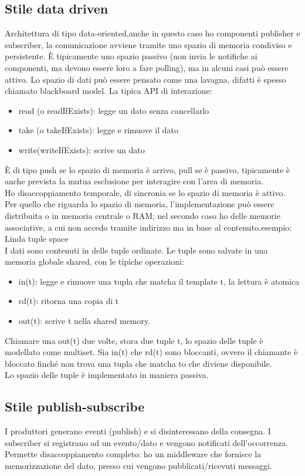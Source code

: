 \documentclass{article}
\begin{document}
\subsection{Stile data driven}
Architettura di tipo data-oriented,anche in questo caso ho componenti publisher e subscriber, la comunicazione avviene tramite uno spazio di memoria condiviso e persistente. È tipicamente uno spazio passivo (non invia le notifiche ai componenti, ma devono essere loro a fare polling), ma in alcuni casi può essere attivo. Lo spazio di dati può essere pensato come una lavagna, difatti è spesso chiamato blackboard model. La tipica API di interazione:
\begin{itemize}
\item read (o readIfExists): legge un dato senza cancellarlo
\item take (o takeIfExists): legge e rimuove il dato
\item write(writeIfExists): scrive un dato  
\end{itemize}
È di tipo push se lo spazio di memoria è arrivo, pull se è passivo, tipicamente è anche prevista la mutua esclusione per interagire con l'area di memoria.\\ Ho disaccoppiamento temporale, di sincronia se lo spazio di memoria è attivo.\\ Per quello che riguarda lo spazio di memoria, l'implementazione può essere distribuita o in memoria centrale o RAM; nel secondo caso ho delle memorie associative, a cui non accedo tramite indirizzo ma in base al contenuto.esempio: Linda tuple space\\
I dati sono contenuti in delle tuple ordinate. Le tuple sono salvate in una memoria globale shared, con le tipiche operazioni:
\begin{itemize}
\item in(t): legge e rimuove una tupla che matcha il template t, la lettura è atomica
\item rd(t): ritorna una copia di t
\item out(t): scrive t nella shared memory.
\end{itemize}
Chiamare una out(t) due volte, stora due tuple t, lo spazio delle tuple è modellato come multiset. Sia in(t) che rd(t) sono bloccanti, ovvero il chiamante è bloccato finché non trova una tupla che matcha to che diviene disponibile.\\ Lo spazio delle tuple è implementato in maniera passiva.
\subsection{Stile publish-subscribe}
I produttori generano eventi (publish) e si disinteressano della consegna. I subscriber si registrano ad un evento/dato e vengono notificati dell'occorrenza.\\ Permette disaccoppiamento completo: ho un middleware che fornisce la memorizzazione del dato, presso cui vengono pubblicati/ricevuti messaggi.
\end{document}

